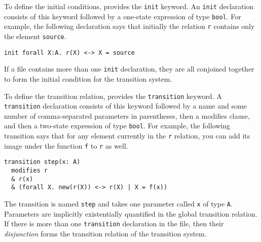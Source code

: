 To define the initial conditions,
  \mypyvy provides the \lstinline[language=mypyvy]{init} keyword.
An \lstinline[language=mypyvy]{init} declaration consists of this keyword
  followed by a one-state expression of type \lstinline[language=mypyvy]{bool}.
For example, the following declaration says that initially
  the relation \lstinline[language=mypyvy]{r} contains only the element \lstinline[language=mypyvy]{source}.
\begin{lstlisting}[language=mypyvy, xleftmargin=.2\textwidth, xrightmargin=.2\textwidth]
  init forall X:A. r(X) <-> X = source
\end{lstlisting}
If a file contains more than one \lstinline[language=mypyvy]{init} declaration,
  they are all conjoined together to form the initial condition for the transition system.

To define the transition relation,
  \mypyvy provides the \lstinline[language=mypyvy]{transition} keyword.
A \lstinline[language=mypyvy]{transition} declaration consists of this keyword
  followed by a name and some number of comma-separated parameters in parentheses,
  then a modifies clause,
  and then a two-state expression of type \lstinline[language=mypyvy]{bool}.
For example, the following transition says that for any element
  currently in the \lstinline[language=mypyvy]{r} relation,
  you can add its image under the function \lstinline[language=mypyvy]{f}
  to \lstinline[language=mypyvy]{r} as well.
\begin{lstlisting}[language=mypyvy, xleftmargin=.2\textwidth, xrightmargin=.2\textwidth]
transition step(x: A)
  modifies r
  & r(x)
  & (forall X. new(r(X)) <-> r(X) | X = f(x))
\end{lstlisting}
The transition is named \lstinline[language=mypyvy]{step} and takes one parameter
  called \lstinline[language=mypyvy]{x} of type \lstinline[language=mypyvy]{A}.
Parameters are implicitly existentially quantified in the global transition relation.
If there is more than one \lstinline[language=mypyvy]{transition} declaration in the file,
  then their \emph{disjunction} forms the transition relation of the transition system.

